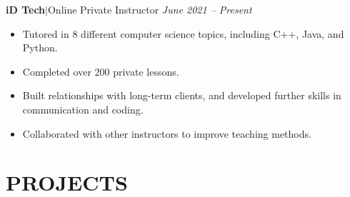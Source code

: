 \documentclass[11pt, a4paper, roman]{moderncv}
\newcommand{\project}[5]{
	\textbf{#1}
	$|$ #3 
	\hfill\textit{#4}
	#5
	\vspace{2mm}
}
\newcommand{\entry}[4]{
	\textbf{#1}\:$|$\:#2 
	\hfill\textit{#3}
	#4
	\vspace{2mm}
}
\begin{document}
\entry{iD Tech}{Online Private Instructor}{June 2021 -- Present}
{\begin{itemize}
    \item Tutored in 8 different computer science topics, including C++, Java, and Python.
    \item Completed over 200 private lessons.
    \item Built relationships with long-term clients, and developed further skills in communication and coding.
    \item Collaborated with other instructors to improve teaching methods.
  \end{itemize}
}

\section{PROJECTS}

\end{document}

